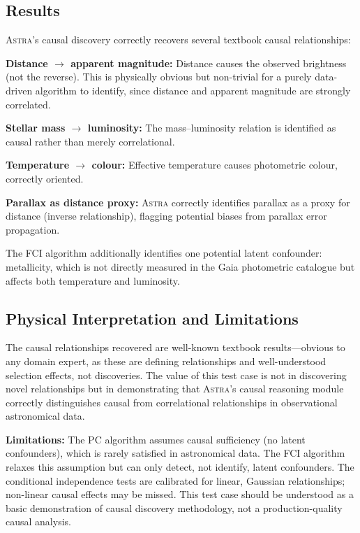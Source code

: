 \documentclass[usenatbib]{rasti}
\newcommand{\astra}{\textsc{Astra}\xspace}
\newcommand{\pc}{PC\xspace}
\newcommand{\fci}{FCI\xspace}
\begin{document}
\subsection{Results}
\label{sec:tc4:results}

\astra's causal discovery correctly recovers several textbook causal relationships:
\begin{description}
  \item \textbf{Distance $\rightarrow$ apparent magnitude:} Distance causes the observed brightness (not the reverse). This is physically obvious but non-trivial for a purely data-driven algorithm to identify, since distance and apparent magnitude are strongly correlated.
  \item \textbf{Stellar mass $\rightarrow$ luminosity:} The mass--luminosity relation is identified as causal rather than merely correlational.
  \item \textbf{Temperature $\rightarrow$ colour:} Effective temperature causes photometric colour, correctly oriented.
  \item \textbf{Parallax as distance proxy:} \astra correctly identifies parallax as a proxy for distance (inverse relationship), flagging potential biases from parallax error propagation.
\end{description}

The \fci algorithm additionally identifies one potential latent confounder: metallicity, which is not directly measured in the Gaia photometric catalogue but affects both temperature and luminosity.

\subsection{Physical Interpretation and Limitations}
\label{sec:tc4:interpretation}

The causal relationships recovered are well-known textbook results---obvious to any domain expert, as these are defining relationships and well-understood selection effects, not discoveries.
The value of this test case is not in discovering novel relationships but in demonstrating that \astra's causal reasoning module correctly distinguishes causal from correlational relationships in observational astronomical data.

\textbf{Limitations:}
The \pc algorithm assumes causal sufficiency (no latent confounders), which is rarely satisfied in astronomical data.
The \fci algorithm relaxes this assumption but can only detect, not identify, latent confounders.
The conditional independence tests are calibrated for linear, Gaussian relationships; non-linear causal effects may be missed.
This test case should be understood as a basic demonstration of causal discovery methodology, not a production-quality causal analysis.
\end{document}
